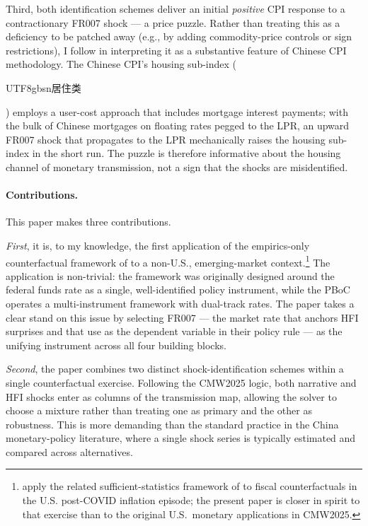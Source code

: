 \documentclass[12pt, a4paper]{article}
\begin{document}
Third, both identification schemes deliver an initial \emph{positive} CPI response to a contractionary FR007 shock --- a price puzzle. Rather than treating this as a deficiency to be patched away (e.g., by adding commodity-price controls or sign restrictions), I follow \citet{chodorow2025} in interpreting it as a substantive feature of Chinese CPI methodology. The Chinese CPI's housing sub-index (\begin{CJK}{UTF8}{gbsn}居住类\end{CJK}) employs a user-cost approach that includes mortgage interest payments; with the bulk of Chinese mortgages on floating rates pegged to the LPR, an upward FR007 shock that propagates to the LPR mechanically raises the housing sub-index in the short run. The puzzle is therefore informative about the housing channel of monetary transmission, not a sign that the shocks are misidentified.

\paragraph{Contributions.} This paper makes three contributions.

\textit{First}, it is, to my knowledge, the first application of the empirics-only counterfactual framework of \citet{wolf2025} to a non-U.S., emerging-market context.\footnote{\citet{bouscasse2024} apply the related sufficient-statistics framework of \citet{mckay2023} to fiscal counterfactuals in the U.S. post-COVID inflation episode; the present paper is closer in spirit to that exercise than to the original U.S.\ monetary applications in CMW2025.} The application is non-trivial: the framework was originally designed around the federal funds rate as a single, well-identified policy instrument, while the PBoC operates a multi-instrument framework with dual-track rates. The paper takes a clear stand on this issue by selecting FR007 --- the market rate that anchors HFI surprises and that \citet{chen2025} use as the dependent variable in their policy rule --- as the unifying instrument across all four building blocks.

\textit{Second}, the paper combines two distinct shock-identification schemes within a single counterfactual exercise. Following the CMW2025 logic, both narrative and HFI shocks enter as columns of the transmission map, allowing the solver to choose a mixture rather than treating one as primary and the other as robustness. This is more demanding than the standard practice in the China monetary-policy literature, where a single shock series is typically estimated and compared across alternatives.
\end{document}
